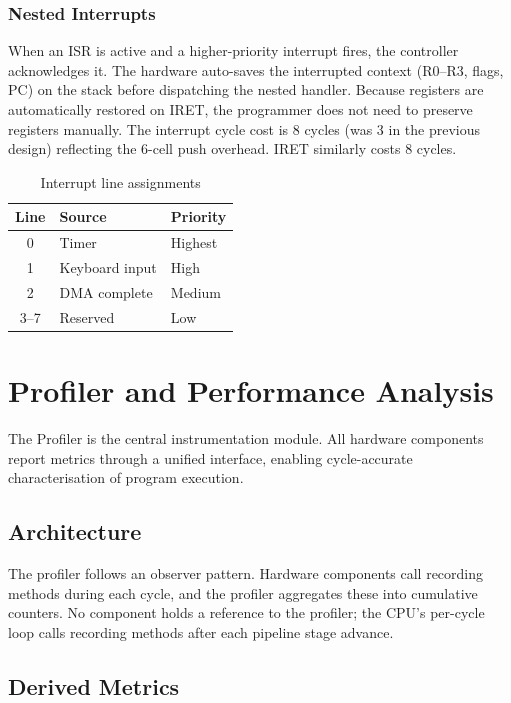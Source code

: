 \documentclass[12pt,a4paper,twoside]{book}
\theoremstyle{trinarytheorem}
\theoremstyle{trinarydefinition}
\newcommand{\code}[1]{\textsf{#1}}
\begin{document}
\subsection{Nested Interrupts}

When an ISR is active and a higher-priority interrupt fires, the
controller acknowledges it. The hardware auto-saves the interrupted
context (R0--R3, flags, PC) on the stack before dispatching the nested
handler. Because registers are automatically restored on IRET, the
programmer does not need to preserve registers manually. The interrupt
cycle cost is 8 cycles (was 3 in the previous design) reflecting the
6-cell push overhead. IRET similarly costs 8 cycles.

\begin{table}[H]
\centering
\caption{Interrupt line assignments}
\label{tab:intsources}
\begin{tabular}{cll}
\toprule
Line & Source & Priority \\
\midrule
0 & Timer & Highest \\
1 & Keyboard input & High \\
2 & DMA complete & Medium \\
3--7 & Reserved & Low \\
\bottomrule
\end{tabular}
\end{table}

\chapter{Profiler and Performance Analysis}
\label{ch:profiler}

The \code{Profiler} is the central instrumentation module. All
hardware components report metrics through a unified interface,
enabling cycle-accurate characterisation of program execution.

\section{Architecture}

The profiler follows an observer pattern. Hardware components call
recording methods during each cycle, and the profiler aggregates
these into cumulative counters. No component holds a reference to
the profiler; the CPU's per-cycle loop calls recording methods after
each pipeline stage advance.

\section{Derived Metrics}
\end{document}
